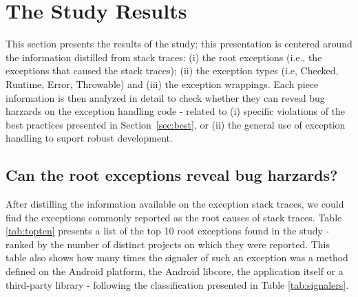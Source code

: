 \documentclass[conference]{IEEEtran}
\begin{document}
\section{The Study Results}
\label{sec:result}


This section presents the results of the study; this presentation is centered around 
the information distilled from stack traces: (i) the root exceptions (i.e., the exceptions that caused the stack traces);
 (ii) the exception types (i.e, Checked, Runtime, Error, Throwable) and (iii) the exception wrappings. 
Each piece information is then analyzed in detail to 
check whether they can reveal bug harzards on the exception handling code -
related to (i) specific violations of the best practices presented in Section~\ref{sec:best},
or (ii) the general use of exception handling to suport robust development.

\subsection{Can the root exceptions reveal bug harzards?}
After distilling the information available on the exception stack traces, we could find 
the exceptions commonly reported as the root causes of stack traces.
Table \ref{tab:topten} presents a list of the top 10 root exceptions found in the study - 
 ranked by the number of distinct projects on which they were reported. 
This table also shows how many times the signaler of such an exception was a method defined on
the Android platform, the Android libcore, the application itself or a third-party library -
 following the classification presented in Table  \ref{tab:signalers}. 
\end{document}
